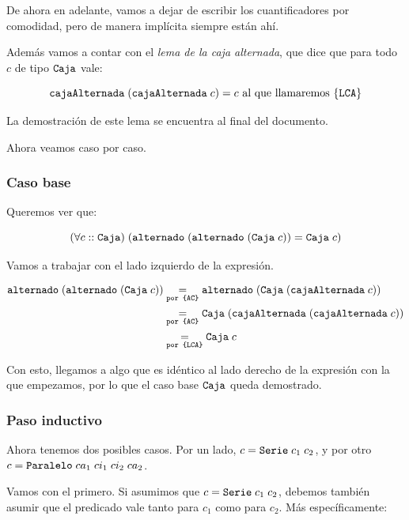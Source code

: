 De ahora en adelante, vamos a dejar de escribir los cuantificadores por comodidad, pero de manera implícita siempre están ahí.

Además vamos a contar con el \textit{lema de la caja alternada}, que dice que para todo $c$ de tipo $\caja$ vale:

$$\cajaAlternada \; (\cajaAlternada \; c) = c \text{ al que llamaremos \formula{LCA}}$$

La demostración de este lema se encuentra al final del documento.

Ahora veamos caso por caso.

\subsubsection*{Caso base}

Queremos ver que:

\begin{equation*}
    \paraTodo{c}{\caja}{\alternado \; (\alternado \; (\caja \; c)) = \caja \; c}
\end{equation*}

Vamos a trabajar con el lado izquierdo de la expresión.

\begin{equation*}
    \begin{aligned}
        \igualesPor{\alternado \; (\alternado \; (\caja \; c))}{\alternado \; (\caja \; (\cajaAlternada \; c))}{por \formula{AC}} \\
        \igualesPor{}{\caja \; (\cajaAlternada \; (\cajaAlternada \; c))}{por \formula{AC}} \\
        \igualesPor{}{\caja \; c}{por \formula{LCA}} \\
    \end{aligned}
\end{equation*}

Con esto, llegamos a algo que es idéntico al lado derecho de la expresión con la que empezamos, por lo que el caso base $\caja$ queda demostrado.

\subsubsection*{Paso inductivo}

Ahora tenemos dos posibles casos. Por un lado, $c = \serie{c_1}{c_2}$, y por otro $c = \paralelo{ca_1}{ci_1}{ci_2}{ca_2}$.

Vamos con el primero. Si asumimos que $c = \serie{c_1}{c_2}$, debemos también asumir que el predicado vale tanto para $c_1$ como para $c_2$. Más específicamente:

